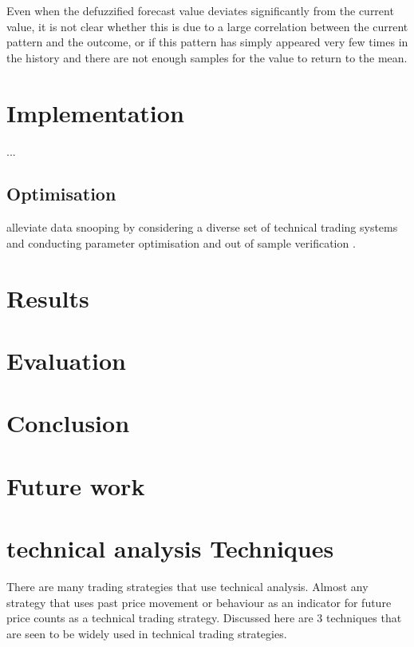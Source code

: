 \documentclass{article}
\theoremstyle{definition}
\begin{document}
Even when the defuzzified forecast value deviates significantly from the current value, it is not clear whether this is due to a large correlation between the current pattern and the outcome, or if this pattern has simply appeared very few times in the history and there are not enough samples for the value to return to the mean.

\section{Implementation}

...

\subsection{Optimisation}

alleviate data snooping by considering a diverse set of technical trading systems and conducting parameter optimisation and out of sample verification \citep{taprofitability}.

\section{Results}

\section{Evaluation}

\section{Conclusion}

\section{Future work}

\appendix

\section{technical analysis Techniques}

\label{app:tatechniques}

There are many trading strategies that use technical analysis. Almost any strategy that uses past price movement or behaviour as an indicator for future price counts as a technical trading strategy. Discussed here are 3 techniques that are seen to be widely used in technical trading strategies.
\end{document}
